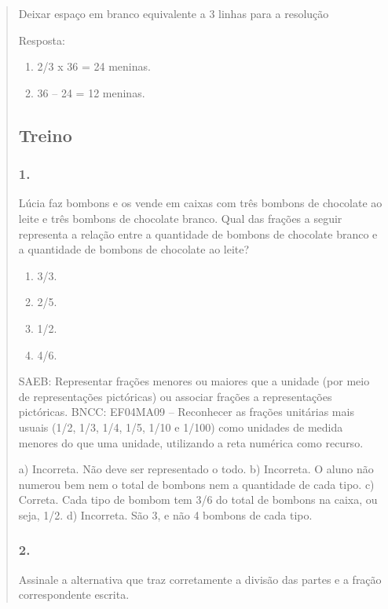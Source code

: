 \begin{enumerate}
\begin{escolha}
\begin{enumerate}
\begin{itemize}
\begin{itemize}
\begin{escolha}
\begin{quote}
\begin{escolha}
{Deixar espaço em branco equivalente a 3 linhas para a resolução

Resposta:

\begin{enumerate}
\def\labelenumi{\alph{enumi})}
\item
  2/3 x 36 = 24 meninas.
\item
  36 -- 24 = 12 meninas.
\end{enumerate}

\subsection{Treino}\label{treino-8}

\subsubsection{1.}\label{section-114}

Lúcia faz bombons e os vende em caixas com três bombons de chocolate ao leite e três bombons de chocolate branco. Qual das frações a seguir representa a relação entre a quantidade de
bombons de chocolate branco e a quantidade de bombons de chocolate ao leite?

\begin{enumerate}
\def\labelenumi{\alph{enumi})}
\item
  3/3.
\item
  2/5.
\item
  1/2.
\item
  4/6.
\end{enumerate}

SAEB: Representar frações menores ou maiores que a unidade (por meio de representações
pictóricas) ou associar frações a representações pictóricas.
BNCC: EF04MA09 -- Reconhecer as frações unitárias mais usuais (1/2, 1/3, 1/4, 1/5, 1/10 e 1/100) como
unidades de medida menores do que uma unidade, utilizando a reta numérica como recurso.

a) Incorreta. Não deve ser representado o todo.
b) Incorreta. O aluno não numerou bem nem o total de bombons nem a quantidade de cada tipo.
c) Correta. Cada tipo de bombom tem 3/6 do total de bombons na caixa, ou seja, 1/2.
d) Incorreta. São 3, e não 4 bombons de cada tipo.


\subsubsection{2.}\label{section-115}

Assinale a alternativa que traz corretamente a divisão das partes e a
fração correspondente escrita.

}
\end{escolha}
\end{quote}
\end{escolha}
\end{itemize}
\end{itemize}
\end{enumerate}
\end{escolha}
\end{enumerate}
